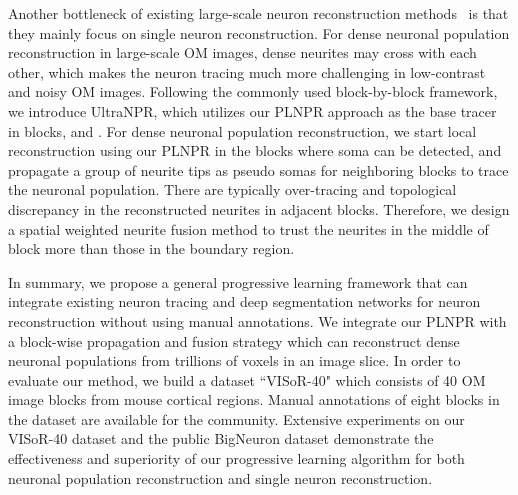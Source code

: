 Another bottleneck of existing large-scale neuron reconstruction methods~\cite{Zhou2015, Peng2017, Wang2018} is that they mainly focus on single neuron reconstruction. 
%
For dense neuronal population reconstruction in large-scale OM images, dense neurites may cross with each other, which makes the neuron tracing much more challenging in low-contrast and noisy OM images. 
% 
Following the commonly used block-by-block framework, we introduce UltraNPR, which utilizes our PLNPR approach as the base tracer in blocks, and .
%
For dense neuronal population reconstruction, we start local reconstruction using our PLNPR in the blocks where soma can be detected, and propagate a group of neurite tips as pseudo somas for neighboring blocks to trace the neuronal population. 
%
There are typically over-tracing and topological discrepancy in the reconstructed neurites in adjacent blocks. 
Therefore, we design a spatial weighted neurite fusion method to trust the neurites in the middle of block more than those in the boundary region.   


In summary, we propose a general progressive learning framework that can integrate existing neuron tracing and deep segmentation networks for neuron reconstruction without using manual annotations.
%
We integrate our PLNPR with a block-wise propagation and fusion strategy which can reconstruct dense neuronal populations from trillions of voxels in an image slice. 
%
In order to evaluate our method, we build a dataset ``VISoR-40" which consists of 40 OM image blocks from mouse cortical regions. Manual annotations of eight blocks in the dataset are available for the community. 
Extensive experiments on our VISoR-40 dataset and the public BigNeuron dataset demonstrate the effectiveness and superiority of our progressive learning algorithm for both neuronal population reconstruction and single neuron reconstruction.




